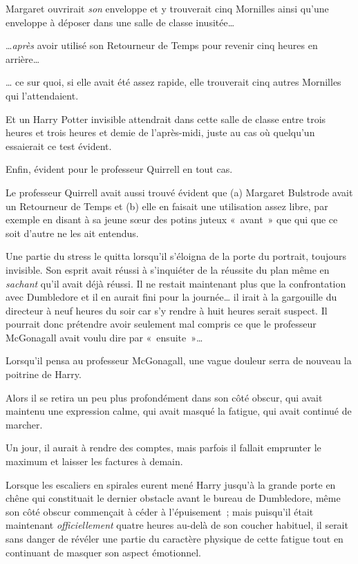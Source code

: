 Margaret ouvrirait \emph{son} enveloppe et y trouverait cinq Mornilles ainsi qu'une enveloppe à déposer dans une salle de classe inusitée…

…\emph{après} avoir utilisé son Retourneur de Temps pour revenir cinq heures en arrière…

… ce sur quoi, si elle avait été assez rapide, elle trouverait cinq autres Mornilles qui l'attendaient.

Et un Harry Potter invisible attendrait dans cette salle de classe entre trois heures et trois heures et demie de l'après-midi, juste au cas où quelqu'un essaierait ce test évident.

Enfin, évident pour le professeur Quirrell en tout cas.

Le professeur Quirrell avait aussi trouvé évident que (a) Margaret Bulstrode avait un Retourneur de Temps et (b) elle en faisait une utilisation assez libre, par exemple en disant à sa jeune sœur des potins juteux «~avant~» que qui que ce soit d'autre ne les ait entendus.

Une partie du stress le quitta lorsqu'il s'éloigna de la porte du portrait, toujours invisible. Son esprit avait réussi à s'inquiéter de la réussite du plan même en \emph{sachant} qu'il avait déjà réussi. Il ne restait maintenant plus que la confrontation avec Dumbledore et il en aurait fini pour la journée… il irait à la gargouille du directeur à neuf heures du soir car s'y rendre à huit heures serait suspect. Il pourrait donc prétendre avoir seulement mal compris ce que le professeur McGonagall avait voulu dire par «~ensuite~»…

Lorsqu'il pensa au professeur McGonagall, une vague douleur serra de nouveau la poitrine de Harry.

Alors il se retira un peu plus profondément dans son côté obscur, qui avait maintenu une expression calme, qui avait masqué la fatigue, qui avait continué de marcher.

Un jour, il aurait à rendre des comptes, mais parfois il fallait emprunter le maximum et laisser les factures à demain.

\later

Lorsque les escaliers en spirales eurent mené Harry jusqu'à la grande porte en chêne qui constituait le dernier obstacle avant le bureau de Dumbledore, même son côté obscur commençait à céder à l'épuisement~; mais puisqu'il était maintenant \emph{officiellement} quatre heures au-delà de son coucher habituel, il serait sans danger de révéler une partie du caractère physique de cette fatigue tout en continuant de masquer son aspect émotionnel.

